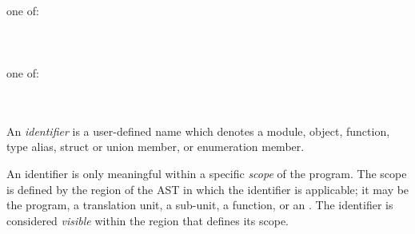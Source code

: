 
\begin{grammar}
\\
\\
 \terminal{::} \\

\\
\\
 \\

 one of:\\
     
     
     
     
 \\
     
     
     
     
 \\
\terminal{\_}\\

 one of:\\
     
   \\

\\
\end{grammar}


\specsubsubitem
An \textit{identifier} is a user-defined name which denotes a module, object,
function, type alias, struct or union member, or enumeration member.

\specsubsubitem
An identifier is only meaningful within a specific \textit{scope} of the
program. The scope is defined by the region of the AST in which the identifier
is applicable; it may be the program, a translation unit, a sub-unit, a
function, or an . The identifier is considered
\textit{visible} within the region that defines its scope.

